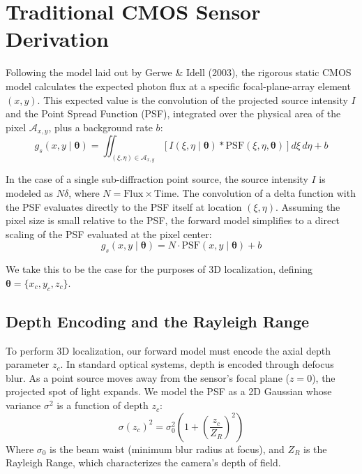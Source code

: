 \documentclass[11pt]{article}
\begin{document}
\section{Traditional CMOS Sensor Derivation}

Following the model laid out by Gerwe \& Idell (2003), the rigorous static CMOS model calculates the expected photon flux at a specific focal-plane-array element $(x, y)$. This expected value is the convolution of the projected source intensity $I$ and the Point Spread Function (PSF), integrated over the physical area of the pixel $\mathcal{A}_{x,y}$, plus a background rate $b$:
\begin{equation}
g_s(x,y \mid \bm{\theta}) = \iint_{(\xi, \eta) \in \mathcal{A}_{x,y}} \left[ I(\xi, \eta \mid \bm{\theta}) * \text{PSF}(\xi, \eta, \bm{\theta}) \right] d\xi \, d\eta + b
\end{equation}

In the case of a single sub-diffraction point source, the source intensity $I$ is modeled as $N\delta$, where $N = \text{Flux} \times \text{Time}$. The convolution of a delta function with the PSF evaluates directly to the PSF itself at location $(\xi, \eta)$. Assuming the pixel size is small relative to the PSF, the forward model simplifies to a direct scaling of the PSF evaluated at the pixel center:
\begin{equation}
g_s(x,y \mid \bm{\theta}) = N \cdot \text{PSF}(x, y \mid \bm{\theta}) + b
\end{equation}

We take this to be the case for the purposes of 3D localization, defining $\bm{\theta} = \{x_c, y_c, z_c\}$.


\subsection{Depth Encoding and the Rayleigh Range}
To perform 3D localization, our forward model must encode the axial depth parameter $z_c$. In standard optical systems, depth is encoded through defocus blur. As a point source moves away from the sensor's focal plane ($z=0$), the projected spot of light expands. We model the PSF as a 2D Gaussian whose variance $\sigma^2$ is a function of depth $z_c$:
\begin{equation}
\sigma(z_c)^2 = \sigma_0^2 \left( 1 + \left(\frac{z_c}{Z_R}\right)^2 \right)
\end{equation}
Where $\sigma_0$ is the beam waist (minimum blur radius at focus), and $Z_R$ is the Rayleigh Range, which characterizes the camera's depth of field. 
\end{document}
